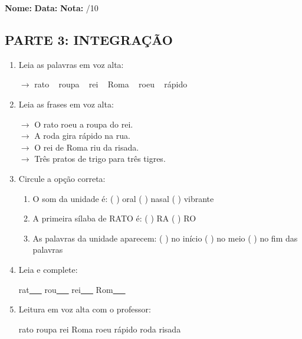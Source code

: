 \begin{exercicio}

\noindent\textbf{Nome:} \underline{\hspace{3.2cm}} \quad \textbf{Data:} \underline{\hspace{1.6cm}} \quad \textbf{Nota:} \underline{\hspace{0.9cm}}/10


\subsection*{PARTE 3: INTEGRAÇÃO}

\begin{enumerate}[resume]

  \item Leia as palavras em voz alta:
  \begin{center}
  $\rightarrow$ rato ~ roupa ~ rei ~ Roma ~ roeu ~ rápido
  \end{center}

  \item Leia as frases em voz alta:
  \begin{center}
  $\rightarrow$ O rato roeu a roupa do rei.\\
  $\rightarrow$ A roda gira rápido na rua.\\
  $\rightarrow$ O rei de Roma riu da risada.\\
  $\rightarrow$ Três pratos de trigo para três tigres.\\
  \end{center}

  \item Circule a opção correta:
  \begin{enumerate}[label=(\alph*)]

    \item O som da unidade é: ( ) oral ( ) nasal ( ) vibrante

    \item A primeira sílaba de RATO é: ( ) RA ( ) RO

    \item As palavras da unidade aparecem: ( ) no início ( ) no meio ( ) no fim das palavras

  \end{enumerate}

  \item Leia e complete:
  \begin{center}
  rat\underline{~~~} \quad rou\underline{~~~} \quad rei\underline{~~~} \quad Rom\underline{~~~}
  \end{center}

  \item Leitura em voz alta com o professor:
  \begin{center}
  rato \quad roupa \quad rei \quad Roma \quad roeu \quad rápido \quad roda \quad risada
  \end{center}

\end{enumerate}

\end{exercicio}

